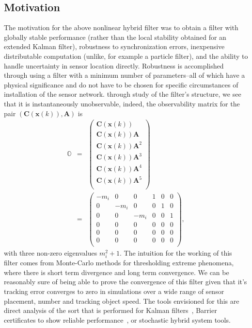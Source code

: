 \subsection{Motivation}
The motivation for the above nonlinear hybrid filter was to obtain a filter with globally stable performance (rather than the local stability obtained for an extended Kalman filter), robustness to synchronization errors, inexpensive distributable computation (unlike, for example a particle filter), and the ability to handle uncertainty in sensor location directly. Robustness is accomplished through using a filter with a minimum number of parameters--all of which have a physical significance and do not have to be chosen for specific circumstances of installation of the sensor network. through study of the filter's structure, we see that it is instantaneously unobservable, indeed, the observability matrix for the pair $\left(\mathbf{C}\left(\mathbf{x}(k)\right),\mathbf{A}\right)$ is
\begin{eqnarray}
    \mathbb{O}&=&\left(\begin{array}{c}\mathbf{C}\left(\mathbf{x}(k)\right)\\
    \mathbf{C}\left(\mathbf{x}(k)\right)\mathbf{A}\\
    \mathbf{C}\left(\mathbf{x}(k)\right)\mathbf{A}^2\\
    \mathbf{C}\left(\mathbf{x}(k)\right)\mathbf{A}^3\\
    \mathbf{C}\left(\mathbf{x}(k)\right)\mathbf{A}^4\\
    \mathbf{C}\left(\mathbf{x}(k)\right)\mathbf{A}^5\\
    \end{array}\right)\label{eqn:obsvmatrix}\\
    &=&\begin{pmatrix}
         -m_i & 0 & 0 & 1 & 0 & 0 \\
         0 & -m_i & 0 & 0 & 1 & 0 \\
         0 & 0 & -m_i & 0 & 0 & 1 \\
         0 & 0 & 0 & 0 & 0 & 0 \\
         0 & 0 & 0 & 0 & 0 & 0 \\
         0 & 0 & 0 & 0 & 0 & 0 \\
       \end{pmatrix}
    \label{eqn:obsveig},
\end{eqnarray}
with three non-zero eigenvalues $m_i^2+1$. The intuition for the working of this filter comes from Monte-Carlo methods for thresholding extreme phenomena, where there is short term divergence and long term convergence. We can be reasonably sure of being able to prove the convergence of this filter given that it's tracking error converges to zero in simulations over a wide range of sensor placement, number and tracking object speed. The tools envisioned for this are direct analysis of the sort that is performed for Kalman filters~\cite{SOLO,BOUGEROL}, Barrier certificates to show reliable performance~\cite{PRAJ,GLA}, or stochastic hybrid system tools.


